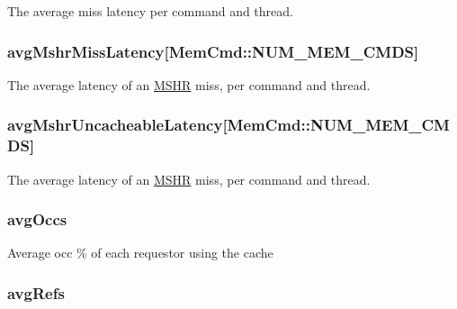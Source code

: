 \label{group__CacheStatistics_ga964a436d0a0ae4006fe5a8b418058e44}
The average miss latency per command and thread. \hypertarget{group__CacheStatistics_gabab885accb53d71c843ad12bc0a928e7}{
\subsubsection[{avgMshrMissLatency}]{ avgMshrMissLatency\mbox{[}MemCmd::NUM\_\-MEM\_\-CMDS\mbox{]}}}
\label{group__CacheStatistics_gabab885accb53d71c843ad12bc0a928e7}
The average latency of an \hyperlink{classMSHR}{MSHR} miss, per command and thread. \hypertarget{group__CacheStatistics_gaf6ebe7e4d284c4f93fd2ec80828e0e82}{
\subsubsection[{avgMshrUncacheableLatency}]{ avgMshrUncacheableLatency\mbox{[}MemCmd::NUM\_\-MEM\_\-CMDS\mbox{]}}}
\label{group__CacheStatistics_gaf6ebe7e4d284c4f93fd2ec80828e0e82}
The average latency of an \hyperlink{classMSHR}{MSHR} miss, per command and thread. \hypertarget{group__CacheStatistics_ga9e42737de532cd164b91f1217862d1ce}{
\subsubsection[{avgOccs}]{ avgOccs}}
\label{group__CacheStatistics_ga9e42737de532cd164b91f1217862d1ce}
Average occ \% of each requestor using the cache \hypertarget{group__CacheStatistics_gadbcb32891448d652807958d7d79cac39}{
\subsubsection[{avgRefs}]{ avgRefs}}
